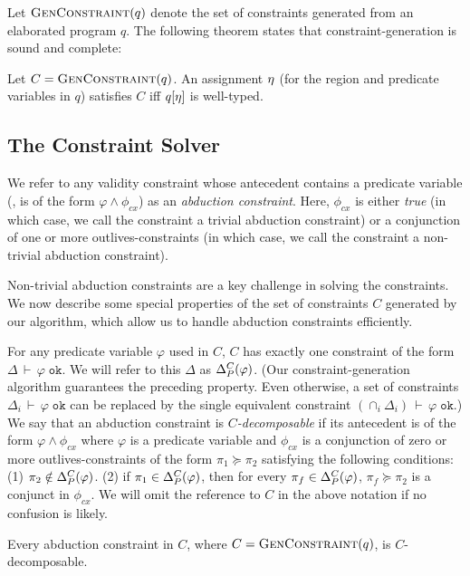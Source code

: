 \documentclass[a4paper,UKenglish]{lipics-v2018}
\newcommand{\conj}{\wedge}
\newcommand{\tywf}[2]{#1\,\vdash\,#2 \; \texttt{ok}}
\newcommand{\outlives}{\succeq}
\newcommand{\phictxt}{\phi_{cx}}
\begin{document}
Let $\textsc{GenConstraint}(q)$ denote the set of constraints generated from an
elaborated program $q$.  The following theorem states that
constraint-generation is sound and complete:
\begin{theorem}
\label{thm:constraint-generation-sc}
  Let $C = \textsc{GenConstraint}(q)$.  An assignment $\eta$ (for the region and
  predicate variables in $q$) satisfies $C$ iff $q[\eta]$ is
  well-typed.
\end{theorem}

\subsection{The Constraint Solver}

We refer to any validity constraint whose antecedent contains a
predicate variable (\ie, is of the form $\varphi \conj \phictxt$) as
an \emph{abduction constraint}.  Here,  $\phictxt$ is either
\emph{true} (in which case, we call the constraint a trivial abduction
constraint) or a conjunction of one or more outlives-constraints (in
which case, we call the constraint a non-trivial abduction
constraint).

Non-trivial abduction constraints are a key challenge in solving the
constraints.  We now describe some special properties of the set of
constraints $C$ generated by our algorithm, which allow us to handle
abduction constraints efficiently.

For any predicate variable $\varphi$ used in $C$, $C$ has exactly one
constraint of the form $\tywf{\Delta}{\varphi}$. We will refer to this
$\Delta$ as $\Delta_P^C(\varphi)$.  (Our constraint-generation algorithm
guarantees the preceding property.  Even otherwise, a set of
constraints $\tywf{\Delta_i}{\varphi}$ can be replaced by the single
equivalent constraint $\tywf{(\cap_i \Delta_i)}{\varphi}$.) We say
that an abduction constraint is \emph{$C$-decomposable} if its
antecedent is of the form $\varphi \conj \phictxt$ where $\varphi$ is
a predicate variable and $\phictxt$ is a conjunction of zero or more
outlives-constraints of the form $\pi_1 \outlives \pi_2$ satisfying
the following conditions: (1) $\pi_2 \notin \Delta_P^C(\varphi)$.  (2)
if $\pi_1 \in \Delta_P^C(\varphi)$, then for every $\pi_f \in
\Delta_P^C(\varphi)$, $\pi_f \outlives \pi_2$ is a conjunct in
$\phictxt$.  We will omit the reference to $C$ in the above notation
if no confusion is likely.

\begin{lemma}
  \label{lemma:gc-is-decomposable}
  Every abduction constraint in $C$, where $C = \textsc{GenConstraint}(q)$, is $C$-decomposable.
\end{lemma}
\end{document}
